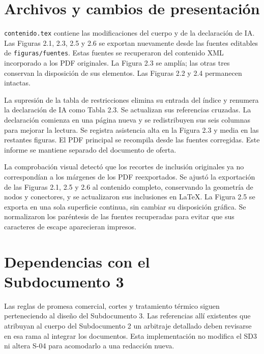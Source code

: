 \documentclass[11pt,letterpaper]{article}
\begin{document}
\section*{Archivos y cambios de presentación}
\texttt{contenido.tex} contiene las modificaciones del cuerpo y de la declaración de IA. Las Figuras 2.1, 2.3, 2.5 y 2.6 se exportan nuevamente desde las fuentes editables de \texttt{figuras/fuentes}. Estas fuentes se recuperaron del contenido XML incorporado a los PDF originales. La Figura 2.3 se amplía; las otras tres conservan la disposición de sus elementos. Las Figuras 2.2 y 2.4 permanecen intactas.

La supresión de la tabla de restricciones elimina su entrada del índice y renumera la declaración de IA como Tabla 2.3. Se actualizan sus referencias cruzadas. La declaración comienza en una página nueva y se redistribuyen sus seis columnas para mejorar la lectura. Se registra asistencia alta en la Figura 2.3 y media en las restantes figuras. El PDF principal se recompila desde las fuentes corregidas. Este informe se mantiene separado del documento de oferta.

La comprobación visual detectó que los recortes de inclusión originales ya no correspondían a los márgenes de los PDF reexportados. Se ajustó la exportación de las Figuras 2.1, 2.5 y 2.6 al contenido completo, conservando la geometría de nodos y conectores, y se actualizaron sus inclusiones en LaTeX. La Figura 2.5 se exporta en una sola superficie continua, sin cambiar su disposición gráfica. Se normalizaron los paréntesis de las fuentes recuperadas para evitar que sus caracteres de escape aparecieran impresos.

\section*{Dependencias con el Subdocumento 3}
Las reglas de promesa comercial, cortes y tratamiento térmico siguen perteneciendo al diseño del Subdocumento 3. Las referencias allí existentes que atribuyan al cuerpo del Subdocumento 2 un arbitraje detallado deben revisarse en esa rama al integrar los documentos. Esta implementación no modifica el SD3 ni altera S-04 para acomodarlo a una redacción nueva.
\end{document}
